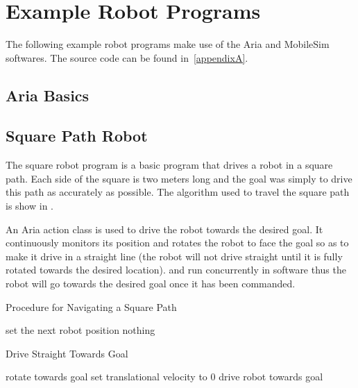 \documentclass[main.tex]{subfiles}
\begin{document}
\section{Example Robot Programs}
The following example robot programs make use of the Aria and MobileSim
softwares. The source code can be found in~\ref{appendixA}.

\subsection{Aria Basics}

\subsection{Square Path Robot}
The square robot program is a basic program that drives a robot in a square
path. Each side of the square is two meters long and the goal was simply to
drive this path as accurately as possible. The algorithm used to travel the
square path is show in . 

An Aria action class is used to drive the robot towards the desired goal. It
continuously monitors its position and rotates the robot to face the goal so as
to make it drive in a straight line (the robot will not drive straight until it
is fully rotated towards the desired location).  and
 run concurrently in software thus the robot will go
towards the desired goal once it has been commanded.

\begin{algorithm}
\caption{Procedure for Navigating a Square Path}
\label{al:alg1}
\begin{algorithmic}
		\STATE set the next robot position 
			\STATE nothing
		\ENDWHILE
	\ENDFOR
\end{algorithmic}
\end{algorithm}

\newcommand{\delxi}{\Delta\xi}

\begin{algorithm}
\caption{Drive Straight Towards Goal}
\label{al:driveStraight}
	\begin{algorithmic}
			\STATE rotate towards goal
			\STATE set translational velocity to 0
			\STATE drive robot towards goal
		\ENDIF
	\end{algorithmic}
\end{algorithm}
\end{document}
